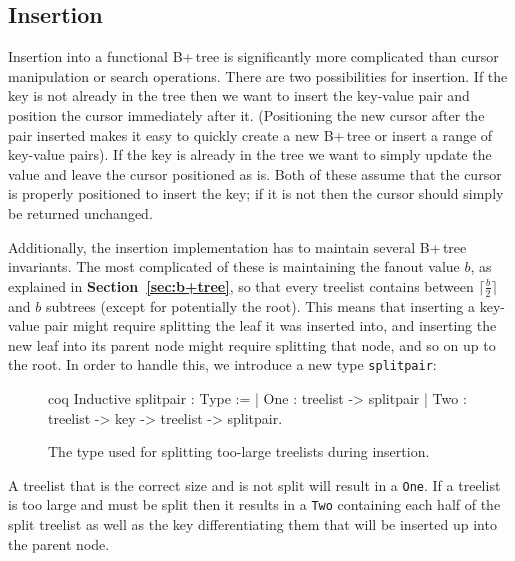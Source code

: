 \documentclass[12pt]{article}
\begin{document}
\subsection{Insertion}

Insertion into a functional B+\,tree is significantly more complicated than cursor manipulation or search operations. There are two possibilities for insertion. If the key is not already in the tree then we want to insert the key-value pair and position the cursor immediately after it. (Positioning the new cursor after the pair inserted makes it easy to quickly create a new B+\,tree or insert a range of key-value pairs). If the key is already in the tree we want to simply update the value and leave the cursor positioned as is. Both of these assume that the cursor is properly positioned to insert the key; if it is not then the cursor should simply be returned unchanged.

Additionally, the insertion implementation has to maintain several B+\,tree invariants. The most complicated of these is maintaining the fanout value $b$, as explained in \textbf{Section~\ref{sec:b+tree}}, so that every treelist contains between $\lceil \frac{b}{2} \rceil$ and $b$ subtrees (except for potentially the root). This means that inserting a key-value pair might require splitting the leaf it was inserted into, and inserting the new leaf into its parent node might require splitting that node, and so on up to the root. In order to handle this, we introduce a new type \texttt{splitpair}:

\begin{singlespace}
\begin{figure}[ht]
\centering
\begin{cminted}{coq}
Inductive splitpair : Type :=
| One : treelist -> splitpair
| Two : treelist -> key -> treelist -> splitpair.
\end{cminted}
\caption{The type used for splitting too-large treelists during insertion.}
\end{figure}
\end{singlespace}

A treelist that is the correct size and is not split will result in a \texttt{One}. If a treelist is too large and must be split then it results in a \texttt{Two} containing each half of the split treelist as well as the key differentiating them that will be inserted up into the parent node.
\end{document}
